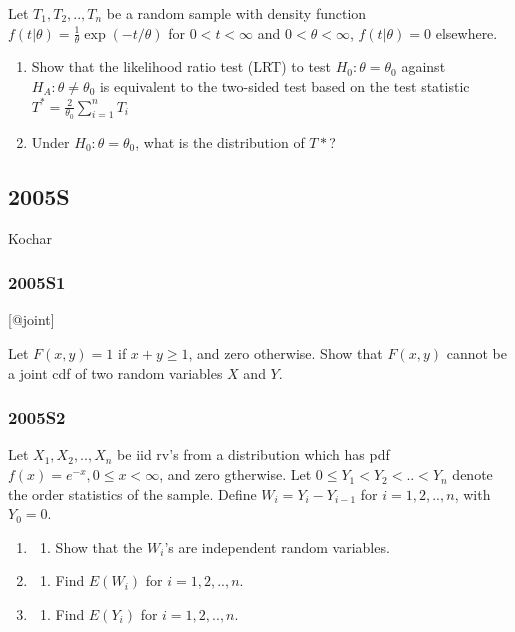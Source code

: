 \documentclass[6pt,Portrait]{article}
\providecommand{\tightlist}{%
  \setlength{\itemsep}{0pt}\setlength{\parskip}{0pt}}
\begin{document}
Let \(T_1,T_2,..,T_n\) be a random sample with density function
\(f(t|\theta)=\frac1\theta\exp(-t/\theta)\) for \(0<t<\infty\) and
\(0<\theta<\infty\), \(f(t|\theta)=0\) elsewhere.

\begin{enumerate}
\def\labelenumi{(\alph{enumi})}
\item
  Show that the likelihood ratio test (LRT) to test
  \(H_0:\theta=\theta_0\) against \(H_A:\theta\neq\theta_0\) is
  equivalent to the two-sided test based on the test statistic
  \(T^*=\frac{2}{\theta_0}\sum^n_{i=1}T_i\)
\item
  Under \(H_0:\theta=\theta_0\), what is the distribution of \(T*\)?
\end{enumerate}

\hypertarget{s-1}{%
\subsection{2005S}\label{s-1}}

Kochar

\hypertarget{s1-1}{%
\subsubsection{2005S1}\label{s1-1}}

{[}@joint{]}

Let \(F(x,y)=1\) if \(x+y\ge1\), and zero otherwise. Show that
\(F(x,y)\) cannot be a joint cdf of two random variables \(X\) and
\(Y\).

\hypertarget{s2-1}{%
\subsubsection{2005S2}\label{s2-1}}

Let \(X_1,X_2,..,X_n\) be iid rv's from a distribution which has pdf
\(f(x)=e^{-x},0\le x<\infty\), and zero gtherwise. Let
\(0\le Y_1<Y_2<..<Y_n\) denote the order statistics of the sample.
Define \(W_i= Y_i-Y_{i-1}\) for \(i = 1,2,..,n\), with \(Y_0=0\).

\begin{enumerate}
\def\labelenumi{(\alph{enumi})}
\item
  \begin{enumerate}
  \def\labelenumii{(\arabic{enumii})}
  \setcounter{enumii}{5}
  \tightlist
  \item
    Show that the \(W_i\)'s are independent random variables.
  \end{enumerate}
\item
  \begin{enumerate}
  \def\labelenumii{(\arabic{enumii})}
  \setcounter{enumii}{2}
  \tightlist
  \item
    Find \(E(W_i)\) for \(i = 1,2,..,n\).
  \end{enumerate}
\item
  \begin{enumerate}
  \def\labelenumii{(\arabic{enumii})}
  \setcounter{enumii}{2}
  \tightlist
  \item
    Find \(E(Y_i)\) for \(i = 1,2,..,n\).
  \end{enumerate}
\end{enumerate}
\end{document}
